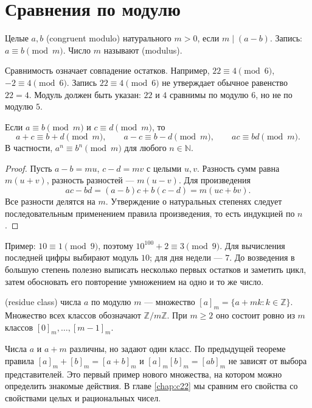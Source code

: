 \section{Сравнения по модулю}
\begin{definition}
Целые \(a,b\)  (congruent modulo) натурального \(m>0\), если \(m\mid(a-b)\). Запись: \(a\equiv b\pmod m\). Число \(m\) называют  (modulus).
\end{definition}
Сравнимость означает совпадение остатков. Например, \(22\equiv4\pmod6\), \(-2\equiv4\pmod6\). Запись \(22\equiv4\pmod6\) не утверждает обычное равенство \(22=4\). Модуль должен быть указан: \(22\) и \(4\) сравнимы по модулю \(6\), но не по модулю \(5\).

\begin{theorem}\label{thm:legacy-c21-2}
Если \(a\equiv b\pmod m\) и \(c\equiv d\pmod m\), то
\[
a+c\equiv b+d\pmod m,\qquad a-c\equiv b-d\pmod m,\qquad ac\equiv bd\pmod m.
\]
В частности, \(a^n\equiv b^n\pmod m\) для любого \(n\in\mathbb N\).
\end{theorem}
\begin{proof}
Пусть \(a-b=mu\), \(c-d=mv\) с целыми \(u,v\). Разность сумм равна \(m(u+v)\), разность разностей — \(m(u-v)\). Для произведения
\[
ac-bd=(a-b)c+b(c-d)=m(uc+bv).
\]
Все разности делятся на \(m\). Утверждение о натуральных степенях следует последовательным применением правила произведения, то есть индукцией по \(n\).
\end{proof}
Пример: \(10\equiv1\pmod9\), поэтому \(10^{100}+2\equiv3\pmod9\). Для вычисления последней цифры выбирают модуль \(10\); для дня недели — \(7\). До возведения в большую степень полезно выписать несколько первых остатков и заметить цикл, затем обосновать его повторение умножением на одно и то же число.

\begin{definition}
 (residue class) числа \(a\) по модулю \(m\) — множество \([a]_m=\{a+mk:k\in\mathbb Z\}\). Множество всех классов обозначают \(\mathbb Z/m\mathbb Z\). При \(m\ge2\) оно состоит ровно из \(m\) классов \([0]_m,\ldots,[m-1]_m\).
\end{definition}
Числа \(a\) и \(a+m\) различны, но задают один класс. По предыдущей теореме правила \([a]_m+[b]_m=[a+b]_m\) и \([a]_m[b]_m=[ab]_m\) не зависят от выбора представителей. Это первый пример нового множества, на котором можно определить знакомые действия. В главе \ref{chap:c22} мы сравним его свойства со свойствами целых и рациональных чисел.


